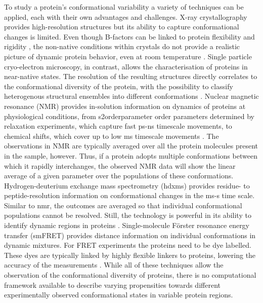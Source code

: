 To study a protein's conformational variability a variety of techniques can be applied, each with their own advantages and challenges. X-ray crystallography provides high-resolution structures but its ability to capture conformational changes is limited. Even though B-factors can be linked to protein flexibility and rigidity \cite{sun_utility_2019}, the non-native conditions within crystals do not provide a realistic picture of dynamic protein behavior, even at room temperature \cite{fenwick_integrated_2014}. Single particle cryo-electron microscopy, in contrast, allows the characterisation of proteins in near-native states. The resolution of the resulting structures directly correlates to the conformational diversity of the protein, with the possibility to classify heterogenous structural ensembles into different conformations \cite{cheng_single-particle_2018}. Nuclear magnetic resonance (NMR) provides in-solution information on dynamics of proteins at physiological conditions, from \gls{s2orderparameter} order parameters determined by relaxation experiments, which capture fast ps-ns timescale movements, to chemical shifts, which cover up to low ms timescale movements \cite{sekhar_nmr_2019}. The observations in NMR are typically averaged over all the protein molecules present in the sample, however. Thus, if a protein adopts multiple conformations between which it rapidly interchanges, the observed NMR data will show the linear average of a given parameter over the populations of these conformations. Hydrogen-deuterium exchange mass spectrometry (\gls{hdxms}) provides residue- to peptide-resolution information on conformational changes in the ms-s time scale. Similar to \gls{nmr}, the outcomes are averaged so that individual conformational populations cannot be resolved. Still, the technology is powerful in its ability to identify dynamic regions in proteins \cite{beveridge_structural_2021}. Single-molecule Förster resonance energy transfer (smFRET) provides distance information on individual conformations in dynamic mixtures. For FRET experiments the proteins need to be dye labelled. These dyes are typically linked by highly flexible linkers to proteins, lowering the accuracy of the measurements \cite{agam_reliability_2023}. While all of these techniques allow the observation of the conformational diversity of proteins, there is no computational framework available to describe varying propensities towards different experimentally observed conformational states in variable protein regions.

